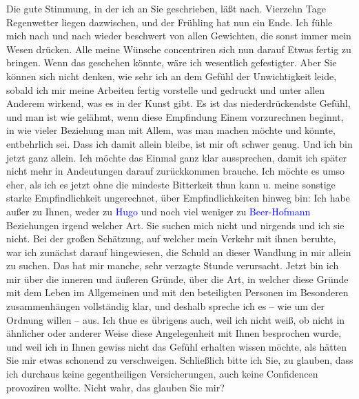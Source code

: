 \pstart
           Die gute Stimmung, in der ich \label{K_L03266-3v}\label{K_L03266-3h} an Sie geschrieben, läßt nach. Vierzehn Tage Regenwetter liegen dazwischen,
               und der Frühling hat nun ein Ende. Ich fühle mich nach und nach wieder beschwert von
               allen Gewichten, die sonst immer mein Wesen drücken. Alle meine Wünsche concentriren
               sich nun darauf Etwas fertig zu bringen. Wenn das geschehen könnte, wäre ich
               wesentlich gefestigter. Aber Sie können sich nicht denken, wie sehr ich an dem Gefühl
               der Unwichtigkeit leide, sobald ich mir meine {\pb}Arbeiten fertig vorstelle und
               gedruckt und unter allen Anderem wirkend, was es in der Kunst gibt. Es ist das
               niederdrückendste Gefühl, und man ist wie gelähmt, wenn diese Empfindung Einem
               vorzurechnen beginnt, in wie vieler Beziehung man mit Allem, was man machen möchte
               und könnte, entbehrlich sei. Dass ich damit allein bleibe, ist mir oft schwer genug.
               Und ich bin jetzt ganz allein. Ich möchte das Einmal ganz klar aussprechen, damit ich
               später nicht mehr in Andeutungen darauf zurückkommen brauche. Ich möchte es umso
               eher, als ich es jetzt ohne die mindeste Bitterkeit thun kann u. meine sonstige
               starke Empfindlichkeit ungerechnet, über Empfindlichkeiten hinweg bin: Ich habe außer
               zu Ihnen, weder zu \textcolor{blue}{Hugo}{}\ledrightnote{\textcolor{blue}{Hugo von Hofmannsthal}} und noch viel weniger
               zu \textcolor{blue}{Beer-Hofmann}{}\ledrightnote{\textcolor{blue}{Richard Beer-Hofmann}} Beziehungen irgend welcher
               Art. Sie suchen mich nicht und nirgends und ich sie nicht. {\pb}Bei der großen Schätzung, auf
               welcher mein Verkehr mit ihnen beruhte, war ich zunächst darauf hingewiesen, die
               Schuld an dieser Wandlung in mir allein zu suchen. Das hat mir manche, sehr verzagte
               Stunde verursacht. Jetzt bin ich mir über die inneren und äußeren Gründe, über die
               Art, in welcher diese Gründe mit dem Leben im Allgemeinen und mit den \introOben{}beteiligten\introOben{} Personen im Besonderen zusammenhängen vollständig
               klar, und deshalb spreche ich es – wie um der Ordnung willen – aus. Ich thue \introOben{}es\introOben{} übrigens auch, weil ich nicht weiß, ob nicht in ähnlicher
               oder anderer Weise diese Angelegenheit mit Ihnen besprochen wurde, und weil ich in
               Ihnen gewiss nicht das Gefühl erhalten wissen möchte, als hätten Sie mir etwas
               schonend zu verschweigen. Schließlich bitte ich Sie, zu glauben, dass ich durchaus
               keine gegentheiligen Versicherungen, auch keine Confidencen provoziren wollte. Nicht
               wahr, das glauben Sie mir?\pend
           
